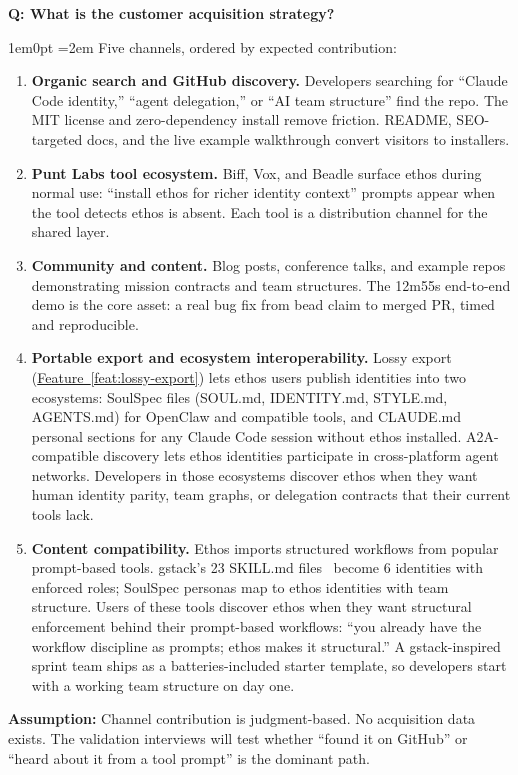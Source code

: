 \documentclass[11pt,letterpaper]{article}
\newcounter{faqnum}
\newenvironment{faqpair}[1]{%
  \needspace{4\baselineskip}%
  \vspace{0.5em}%
  \refstepcounter{faqnum}%
  \noindent\textbf{\color{SectionBlue}Q\thefaqnum: #1}\par\nopagebreak[4]%
  \vspace{0.2em}%
  \begin{adjustwidth}{1em}{0pt}%
  \setlength{\parindent}{0pt}%
  \emergencystretch=2em%
}{%
  \end{adjustwidth}%
  \vspace{0.5em}%
}
\newcommand{\featureref}[1]{\hyperref[#1]{Feature~\ref*{#1}}}
\begin{document}
\begin{faqpair}{What is the customer acquisition strategy?}\label{faq:acquisition}
Five channels, ordered by expected contribution:

\begin{enumerate}[nosep]
  \item \textbf{Organic search and GitHub discovery.} Developers searching for ``Claude Code identity,'' ``agent delegation,'' or ``AI team structure'' find the repo. The MIT license and zero-dependency install remove friction. README, SEO-targeted docs, and the live example walkthrough convert visitors to installers.
  \item \textbf{Punt Labs tool ecosystem.} Biff, Vox, and Beadle surface ethos during normal use: ``install ethos for richer identity context'' prompts appear when the tool detects ethos is absent. Each tool is a distribution channel for the shared layer.
  \item \textbf{Community and content.} Blog posts, conference talks, and example repos demonstrating mission contracts and team structures. The 12m55s end-to-end demo is the core asset: a real bug fix from bead claim to merged PR, timed and reproducible.
  \item \textbf{Portable export and ecosystem interoperability.} Lossy export (\featureref{feat:lossy-export}) lets ethos users publish identities into two ecosystems: SoulSpec files (SOUL.md, IDENTITY.md, STYLE.md, AGENTS.md) for OpenClaw and compatible tools, and CLAUDE.md personal sections for any Claude Code session without ethos installed. A2A-compatible discovery lets ethos identities participate in cross-platform agent networks. Developers in those ecosystems discover ethos when they want human identity parity, team graphs, or delegation contracts that their current tools lack.
  \item \textbf{Content compatibility.} Ethos imports structured workflows from popular prompt-based tools. gstack's 23 SKILL.md files~\cite{gstack2025github} become 6 identities with enforced roles; SoulSpec personas map to ethos identities with team structure. Users of these tools discover ethos when they want structural enforcement behind their prompt-based workflows: ``you already have the workflow discipline as prompts; ethos makes it structural.'' A gstack-inspired sprint team ships as a batteries-included starter template, so developers start with a working team structure on day one.
\end{enumerate}

\textbf{Assumption:} Channel contribution is judgment-based. No acquisition data exists. The validation interviews will test whether ``found it on GitHub'' or ``heard about it from a tool prompt'' is the dominant path.
\end{faqpair}
\end{document}
